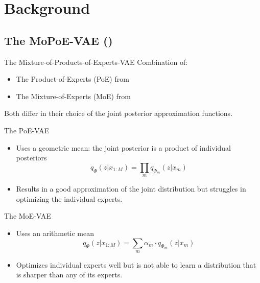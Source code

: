     \section{Background}

    \subsection{The MoPoE-VAE (\cite{thomas_gener-ELBO})}
    \begin{frame}{The Mixture-of-Products-of-Experts-VAE}
        Combination of:
        \begin{itemize}
            \item The Product-of-Experts (PoE) from \cite{wu2018multimodal}
            \item The Mixture-of-Experts (MoE) from \cite{shi2019variational}
        \end{itemize}
        \vspace{\baselineskip}
        Both differ in their choice of the joint posterior approximation functions.
    \end{frame}

    \begin{frame}{The PoE-VAE}

        \begin{itemize}
            \item Uses a geometric mean: the joint posterior is a product of individual posteriors
            \begin{equation}
                q_{\Phi}(z|x_{1:M})=\prod _m q_{\Phi_m}(z|x_m)
            \end{equation}
            \item Results in a good approximation of the joint distribution but struggles in optimizing the individual experts.
        \end{itemize}

    \end{frame}

    \begin{frame}{The MoE-VAE}
        \begin{itemize}
            \item Uses an arithmetic mean
            \begin{equation}
                q_{\Phi}(z|x_{1:M})=\sum _m \alpha_m\cdot q_{\Phi_m}(z|x_m)
            \end{equation}
            \item Optimizes individual experts well but is not able to learn a distribution that is sharper than any of its experts.
        \end{itemize}

    \end{frame}

